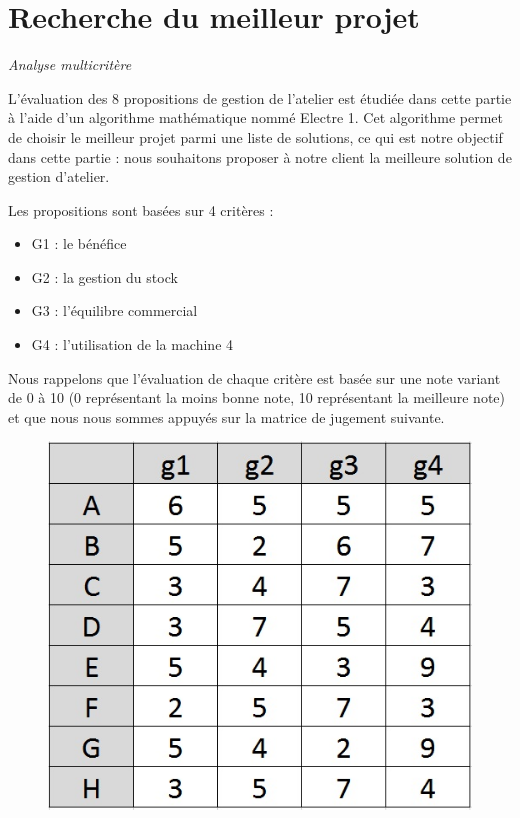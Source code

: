 \documentclass[a4paper,10pt]{article}
\begin{document}
\newpage
\part{Recherche du meilleur projet}
\begin{large}
\emph{Analyse multicritère}
\end{large}

L'évaluation des 8 propositions de gestion de l'atelier est étudiée dans cette partie à l'aide d'un algorithme mathématique nommé Electre 1. Cet algorithme permet de choisir le meilleur projet parmi une liste de solutions, ce qui est notre objectif dans cette partie : nous souhaitons proposer à notre client la meilleure solution de gestion d'atelier.

Les propositions sont basées sur 4 critères  :
\begin{itemize}
\item G1 : le bénéfice
\item G2 : la gestion du stock
\item G3 : l'équilibre commercial
\item G4 : l'utilisation de la machine 4
\end{itemize}

Nous rappelons que l'évaluation de chaque critère est basée sur une note variant de 0 à 10 (0 représentant la moins bonne note, 10 représentant la meilleure note) et que nous nous sommes appuyés sur la matrice de jugement suivante.

\begin{figure}[h]
\begin{center}
\includegraphics[scale=0.3]{img/AD-Jugement.jpg}
\end{center}
\end{figure}
\end{document}
